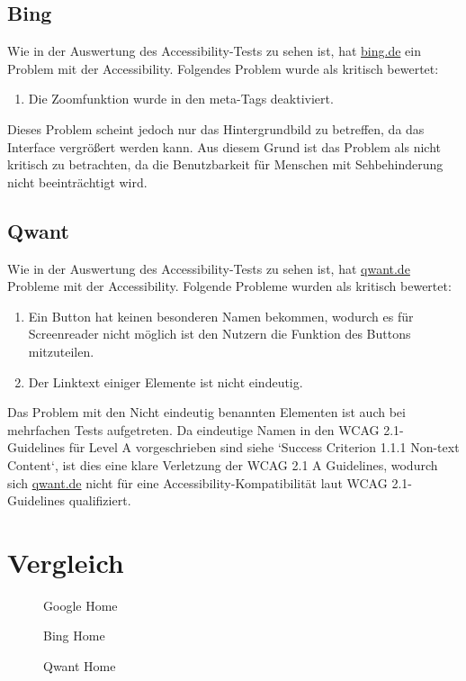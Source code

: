 \subsection{Bing}\label{subsec:bing}
Wie in der Auswertung des Accessibility-Tests zu sehen ist, hat \url{bing.de} ein Problem mit der Accessibility.
Folgendes Problem wurde als kritisch bewertet:
\begin{enumerate}
    \item Die Zoomfunktion wurde in den meta-Tags deaktiviert.
\end{enumerate}
Dieses Problem scheint jedoch nur das Hintergrundbild zu betreffen, da das Interface vergrößert werden kann.
Aus diesem Grund ist das Problem als nicht kritisch zu betrachten, da die Benutzbarkeit für Menschen mit Sehbehinderung nicht beeinträchtigt wird.

\subsection{Qwant}\label{subsec:qwant}
Wie in der Auswertung des Accessibility-Tests zu sehen ist, hat \url{qwant.de} Probleme mit der Accessibility.
Folgende Probleme wurden als kritisch bewertet:
\begin{enumerate}
    \item Ein Button hat keinen besonderen Namen bekommen, wodurch es für Screenreader nicht möglich ist den Nutzern die Funktion des Buttons mitzuteilen.
    \item Der Linktext einiger Elemente ist nicht eindeutig.
\end{enumerate}
Das Problem mit den Nicht eindeutig benannten Elementen ist auch bei mehrfachen Tests aufgetreten.
Da eindeutige Namen in den WCAG 2.1-Guidelines für Level A vorgeschrieben sind siehe `Success Criterion 1.1.1 Non-text Content`\cite{WCAG21},
ist dies eine klare Verletzung der WCAG 2.1 A Guidelines, wodurch sich \url{qwant.de} nicht für eine Accessibility-Kompatibilität laut WCAG 2.1-Guidelines qualifiziert.

\section{Vergleich}\label{sec:vergleich}
\begin{figure}[h]
    \centering
    \caption{Google Home}\label{fig:google_home}
    \caption{Bing Home}\label{fig:bing_home}
    \caption{Qwant Home}\label{fig:qwant_home}
\end{figure}